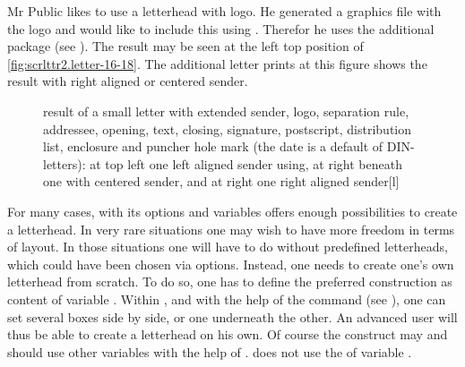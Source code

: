 \begin{Example}
  Mr Public likes to use a letterhead with logo. He generated a graphics file
  with the logo and would like to include this using
  . Therefor he uses the additional package
   (see \cite{package:graphics}).%
  The result may be seen at the left top position of
  \autoref{fig:scrlttr2.letter-16-18}. The additional letter prints at this
  figure shows the result with right aligned or centered sender.
  \begin{figure}
    \setcapindent{0pt}%
    {\hfill
      \quad
      \par\bigskip}
    \begin{captionbeside}
      {result of a small letter with extended sender, logo, separation rule,
        addressee, opening, text, closing, signature, postscript, distribution
        list, enclosure and puncher hole mark (the date is a default of
        DIN-letters): at top left one left aligned sender using, at right
        beneath one with centered sender, and at right one right aligned
        sender}[l]
      \quad
    \end{captionbeside}
  \label{fig:scrlttr2.letter-16-18}
  \end{figure}
\end{Example}%
%
%
%

\begin{Declaration}
\end{Declaration}
%
For many cases,  with its options and variables offers
enough possibilities to create a letterhead. In very rare situations
one may wish to have more freedom in terms of layout. In those
situations one will have to do without predefined letterheads, which
could have been chosen via options. Instead, one needs to create one's
own letterhead from scratch. To do so, one has to define the preferred
construction as content of variable . Within
, and with the help of the  command
(see \cite{latex:usrguide}), one can set several boxes side by side,
or one underneath the other. An advanced user will thus be able to
create a letterhead on his own. Of course the construct may
and should use other variables with the help of
. \KOMAScript{} does not use the
 of variable .

